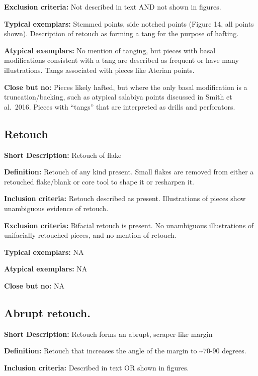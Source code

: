 \documentclass[
]{article}
\begin{document}
\textbf{Exclusion criteria:} Not described in text AND not shown in
figures.

\textbf{Typical exemplars:} Stemmed points, side notched points (Figure
14, all points shown). Description of retouch as forming a tang for the
purpose of hafting.

\textbf{Atypical exemplars:} No mention of tanging, but pieces with
basal modifications consistent with a tang are described as frequent or
have many illustrations. Tangs associated with pieces like Aterian
points.

\textbf{Close but no:} Pieces likely hafted, but where the only basal
modification is a truncation/backing, such as atypical salabiya points
discussed in Smith et al.~2016. Pieces with ``tangs'' that are
interpreted as drills and perforators.

\hypertarget{retouch}{%
\subsection{Retouch}\label{retouch}}

\textbf{Short Description:} Retouch of flake

\textbf{Definition:} Retouch of any kind present. Small flakes are
removed from either a retouched flake/blank or core tool to shape it or
resharpen it.

\textbf{Inclusion criteria:} Retouch described as present. Illustrations
of pieces show unambiguous evidence of retouch.

\textbf{Exclusion criteria:} Bifacial retouch is present. No unambiguous
illustrations of unifacially retouched pieces, and no mention of
retouch.

\textbf{Typical exemplars:} NA

\textbf{Atypical exemplars:} NA

\textbf{Close but no:} NA

\hypertarget{abrupt-retouch.}{%
\subsection{Abrupt retouch.}\label{abrupt-retouch.}}

\textbf{Short Description:} Retouch forms an abrupt, scraper-like margin

\textbf{Definition:} Retouch that increases the angle of the margin to
\textasciitilde70-90 degrees.

\textbf{Inclusion criteria:} Described in text OR shown in figures.
\end{document}
